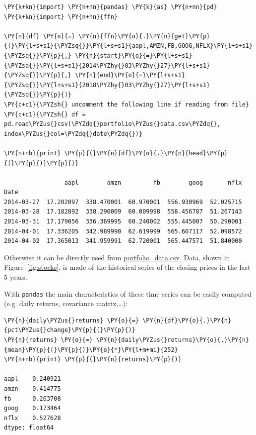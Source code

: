 \begin{codebox}
\begin{Verbatim}[commandchars=\\\{\}]
\PY{k+kn}{import} \PY{n+nn}{pandas} \PY{k}{as} \PY{n+nn}{pd}
\PY{k+kn}{import} \PY{n+nn}{ffn}
		
\PY{n}{df} \PY{o}{=} \PY{n}{ffn}\PY{o}{.}\PY{n}{get}\PY{p}{(}\PY{l+s+s1}{\PYZsq{}}\PY{l+s+s1}{aapl,AMZN,FB,GOOG,NFLX}\PY{l+s+s1}{\PYZsq{}}\PY{p}{,} \PY{n}{start}\PY{o}{=}\PY{l+s+s1}{\PYZsq{}}\PY{l+s+s1}{2014\PYZhy{}03\PYZhy{}27}\PY{l+s+s1}{\PYZsq{}}\PY{p}{,} \PY{n}{end}\PY{o}{=}\PY{l+s+s1}{\PYZsq{}}\PY{l+s+s1}{2018\PYZhy{}03\PYZhy{}27}\PY{l+s+s1}{\PYZsq{}}\PY{p}{)}
\PY{c+c1}{\PYZsh{} uncomment the following line if reading from file}
\PY{c+c1}{\PYZsh{} df = pd.read\PYZus{}csv(\PYZdq{}portfolio\PYZus{}data.csv\PYZdq{}, index\PYZus{}col=\PYZdq{}date\PYZdq{})}
		
\PY{n+nb}{print} \PY{p}{(}\PY{n}{df}\PY{o}{.}\PY{n}{head}\PY{p}{(}\PY{p}{)}\PY{p}{)}

                 aapl        amzn         fb        goog       nflx
Date
2014-03-27  17.202097  338.470001  60.970001  556.930969  52.025715
2014-03-28  17.182892  338.290009  60.009998  558.456787  51.267143
2014-03-31  17.179056  336.369995  60.240002  555.445007  50.290001
2014-04-01  17.336205  342.989990  62.619999  565.607117  52.098572
2014-04-02  17.365013  341.959991  62.720001  565.447571  51.840000
\end{Verbatim}
\end{codebox}

Otherwise it can be directly used from \href{https://raw.githubusercontent.com/matteosan1/finance_course/develop/libro/input_files/portfolio_data.csv}{portfolio\_data.csv}. 
Data, shown in Figure~\ref{fig:stocks}, is made of the historical 
series of the closing prices in the last 5 years. 

With \texttt{pandas} the main characteristics of these time series can
be easily computed (e.g. daily returns, covariance matrix,\ldots):

\begin{codebox}
\begin{Verbatim}[commandchars=\\\{\}]
\PY{n}{daily\PYZus{}returns} \PY{o}{=} \PY{n}{df}\PY{o}{.}\PY{n}{pct\PYZus{}change}\PY{p}{(}\PY{p}{)}
\PY{n}{returns} \PY{o}{=} \PY{n}{daily\PYZus{}returns}\PY{o}{.}\PY{n}{mean}\PY{p}{(}\PY{p}{)}\PY{o}{*}\PY{l+m+mi}{252}
\PY{n+nb}{print} \PY{p}{(}\PY{n}{returns}\PY{p}{)}

aapl    0.240921
amzn    0.414775
fb      0.263708
goog    0.173464
nflx    0.527628
dtype: float64
\end{Verbatim}
\end{codebox}

